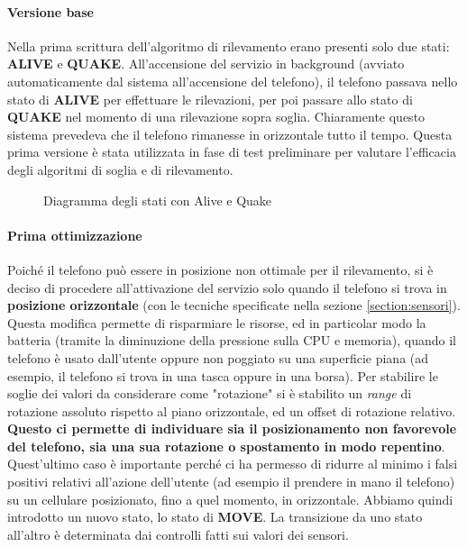 \documentclass[a4paper,10pt]{memoir}
\begin{document}
\paragraph{Versione base} Nella prima scrittura dell'algoritmo di rilevamento erano presenti solo due stati: \textbf{ALIVE} e \textbf{QUAKE}. All'accensione del servizio in background (avviato automaticamente dal sistema all'accensione del telefono), il telefono passava nello stato di \textbf{ALIVE} per effettuare le rilevazioni, per poi passare allo stato di \textbf{QUAKE} nel momento di una rilevazione sopra soglia. Chiaramente questo sistema prevedeva che il telefono rimanesse in orizzontale tutto il tempo. Questa prima versione è stata utilizzata in fase di test preliminare per valutare l'efficacia degli algoritmi di soglia e di rilevamento.

\begin{figure}[ht]
\centering
\label{fig:scs_sm0}
\caption{Diagramma degli stati con Alive e Quake}
\end{figure}

\paragraph{Prima ottimizzazione} Poiché il telefono può essere in posizione non ottimale per il rilevamento, si è deciso di procedere all'attivazione del servizio solo quando il telefono si trova in \textbf{posizione orizzontale} (con le tecniche specificate nella sezione \ref{section:sensori}). Questa modifica permette di risparmiare le risorse, ed in particolar modo la batteria (tramite la diminuzione della pressione sulla CPU e memoria), quando il telefono è usato dall'utente oppure non poggiato su una superficie piana (ad esempio, il telefono si trova in una tasca oppure in una borsa). Per stabilire le soglie dei valori da considerare come "rotazione" si è stabilito un \textit{range} di rotazione assoluto rispetto al piano orizzontale, ed un offset di rotazione relativo. \textbf{Questo ci permette di individuare sia il posizionamento non favorevole del telefono, sia una sua rotazione o spostamento in modo repentino}. Quest'ultimo caso è importante perché ci ha permesso di ridurre al minimo i falsi positivi relativi all'azione dell'utente (ad esempio il prendere in mano il telefono) su un cellulare posizionato, fino a quel momento, in orizzontale. Abbiamo quindi introdotto un nuovo stato, lo stato di \textbf{MOVE}. La transizione da uno stato all'altro è determinata dai controlli fatti sui valori dei sensori.
\end{document}
